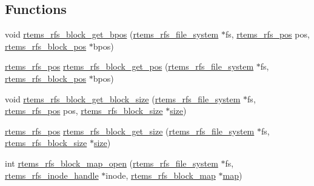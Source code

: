 \subsection*{Functions}
\begin{DoxyCompactItemize}
\item 
void \mbox{\hyperlink{rtems-rfs-block_8c_a35848429d41d99f4aab4be97b41a324e}{rtems\+\_\+rfs\+\_\+block\+\_\+get\+\_\+bpos}} (\mbox{\hyperlink{struct__rtems__rfs__file__system}{rtems\+\_\+rfs\+\_\+file\+\_\+system}} $\ast$fs, \mbox{\hyperlink{rtems-rfs-file-system_8h_ae6adc04fe673c46403605d64f16699bd}{rtems\+\_\+rfs\+\_\+pos}} pos, \mbox{\hyperlink{rtems-rfs-block-pos_8h_a0d8bd7482333e584a03df45e60cda226}{rtems\+\_\+rfs\+\_\+block\+\_\+pos}} $\ast$bpos)
\item 
\mbox{\hyperlink{rtems-rfs-file-system_8h_ae6adc04fe673c46403605d64f16699bd}{rtems\+\_\+rfs\+\_\+pos}} \mbox{\hyperlink{rtems-rfs-block_8c_a76f70461e9f76aa1f6739a13a8f26735}{rtems\+\_\+rfs\+\_\+block\+\_\+get\+\_\+pos}} (\mbox{\hyperlink{struct__rtems__rfs__file__system}{rtems\+\_\+rfs\+\_\+file\+\_\+system}} $\ast$fs, \mbox{\hyperlink{rtems-rfs-block-pos_8h_a0d8bd7482333e584a03df45e60cda226}{rtems\+\_\+rfs\+\_\+block\+\_\+pos}} $\ast$bpos)
\item 
void \mbox{\hyperlink{rtems-rfs-block_8c_a6982a30feb7426e107b0c899b80fbbe6}{rtems\+\_\+rfs\+\_\+block\+\_\+get\+\_\+block\+\_\+size}} (\mbox{\hyperlink{struct__rtems__rfs__file__system}{rtems\+\_\+rfs\+\_\+file\+\_\+system}} $\ast$fs, \mbox{\hyperlink{rtems-rfs-file-system_8h_ae6adc04fe673c46403605d64f16699bd}{rtems\+\_\+rfs\+\_\+pos}} pos, \mbox{\hyperlink{rtems-rfs-block-pos_8h_aa72438eee22908110dc633ca6b89b390}{rtems\+\_\+rfs\+\_\+block\+\_\+size}} $\ast$\mbox{\hyperlink{sun4u_2tte_8h_a245260f6f74972558f61b85227df5aae}{size}})
\item 
\mbox{\hyperlink{rtems-rfs-file-system_8h_ae6adc04fe673c46403605d64f16699bd}{rtems\+\_\+rfs\+\_\+pos}} \mbox{\hyperlink{rtems-rfs-block_8c_a4420107003db9b6d34945a95ab14b520}{rtems\+\_\+rfs\+\_\+block\+\_\+get\+\_\+size}} (\mbox{\hyperlink{struct__rtems__rfs__file__system}{rtems\+\_\+rfs\+\_\+file\+\_\+system}} $\ast$fs, \mbox{\hyperlink{rtems-rfs-block-pos_8h_aa72438eee22908110dc633ca6b89b390}{rtems\+\_\+rfs\+\_\+block\+\_\+size}} $\ast$\mbox{\hyperlink{sun4u_2tte_8h_a245260f6f74972558f61b85227df5aae}{size}})
\item 
int \mbox{\hyperlink{rtems-rfs-block_8c_a5a09f0d3d9d4e31367c51ceadb7dea31}{rtems\+\_\+rfs\+\_\+block\+\_\+map\+\_\+open}} (\mbox{\hyperlink{struct__rtems__rfs__file__system}{rtems\+\_\+rfs\+\_\+file\+\_\+system}} $\ast$fs, \mbox{\hyperlink{rtems-rfs-inode_8h_a91f02dac5a2d91e072d676f3266ab8d2}{rtems\+\_\+rfs\+\_\+inode\+\_\+handle}} $\ast$inode, \mbox{\hyperlink{rtems-rfs-block_8h_af488270acef452a961e888bffdc3a7bf}{rtems\+\_\+rfs\+\_\+block\+\_\+map}} $\ast$\mbox{\hyperlink{struct__map}{map}})

\end{DoxyCompactItemize}
